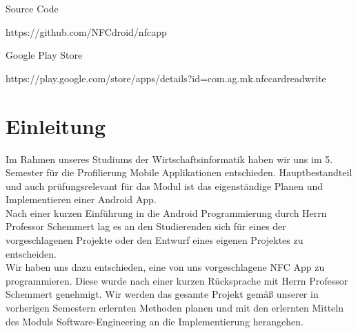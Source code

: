 \documentclass[a4paper,ngerman,12pt]{scrreprt}
\newcommand{\+}{\discretionary{\mbox{\scriptsize$\hookleftarrow$}}{}{}}
\begin{document}
\begin{titlepage}
\begin{center}
		\begin{minipage}{0.2\textwidth}
			\begin{flushleft}
				{\footnotesize Source Code}
			\end{flushleft}
		\end{minipage}
		\hfill
		\begin{minipage}{0.75\textwidth}
			\begin{flushleft}
				{\normalsize
				https://github.com/NFCdroid/nfcapp
				}
			\end{flushleft}
		\end{minipage}
		\begin{minipage}{0.2\textwidth}
			\begin{flushleft}
				{\footnotesize Google Play Store}
			\end{flushleft}
		\end{minipage}
		\hfill
		\begin{minipage}{0.75\textwidth}
			\begin{flushleft}
				{\normalsize
					https://play.google.com/store/apps/details?id=com.ag.mk.nfccardreadwrite
				}
			\end{flushleft}
		\end{minipage}
		\vfill
	\end{center}
\end{titlepage}

\begingroup
\renewcommand*{\chapterpagestyle}{empty}
\pagestyle{empty}
\tableofcontents
\clearpage
\endgroup

\chapter{Einleitung}
 Im Rahmen unseres Studiums der Wirtschaftsinformatik haben wir uns im 5. Semester für die Profilierung Mobile Applikationen entschieden. Hauptbestandteil und auch prüfungsrelevant für das Modul ist das eigenständige Planen und Implementieren einer Android App. \\
 Nach einer kurzen Einführung in die Android Programmierung durch Herrn Professor Schemmert lag es an den Studierenden sich für eines der vorgeschlagenen Projekte oder den Entwurf eines eigenen Projektes zu entscheiden. \\
 Wir haben uns dazu entschieden, eine von uns vorgeschlagene \ac{NFC} App zu programmieren. Diese wurde nach einer kurzen Rücksprache mit Herrn Professor Schemmert genehmigt. \newline
 Wir werden das gesamte Projekt gemäß unserer in vorherigen Semestern erlernten Methoden planen und mit den erlernten Mitteln des Moduls Software-\/\+Engineering an die Implementierung herangehen.
\end{document}
